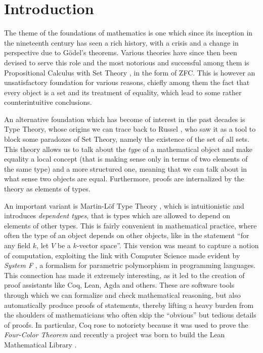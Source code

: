 \chapter*{Introduction}

The theme of the foundations of mathematics is one which since its inception in
the nineteenth century has seen a rich history, with a crisis and a change in
perspective due to G{\"o}del's theorems. Various theories have since then been
devised to serve this role and the most notorious and successful among them is
Propositional Calculus with
Set Theory \cite{Jec13}, in the form of ZFC. This is however an
unsatisfactory foundation
for various reasons, chiefly among them the fact that every object is a set and
its treatment of equality, which lead to some rather counterintuitive
conclusions.

\noindent
An alternative foundation which has become of interest in the past decades is
Type Theory, whose origins we can trace back to Russel \cite{Rus08,RW97},
who saw it as a tool to
block some paradoxes of Set Theory,
namely the existence of the set of all sets. This theory allows us to talk about
the \emph{type} of a mathematical
object and make equality a local concept (that is making sense only in terms of
two elements of the same type) and a more structured one, meaning that we can
talk about in what sense two objects are equal. Furthermore, proofs are
internalized by the theory as elements of types.

\noindent
An important variant is Martin-L{\"o}f Type Theory \cite{ML84}, which is
intuitionistic and introduces \emph{dependent types}, that is types which are
allowed to depend on elements of other types. This is fairly convenient in
mathematical practice, where often the type of an object depends on other
objects, like in the statement ``for any field
$k$, let $V$ be a $k$-vector space''. This version was meant
to capture a notion of computation, exploiting the link with Computer Science
made evident by \emph{System F} \cite{Gir89}, a formalism for parametric
polymorphism in programming languages. This connection
has made it extremely interesting, as it led to the
creation of proof assistants like Coq, Lean, Agda and others. These are software
tools through which we can formalize and check mathematical reasoning, but also
automatically produce proofs of statements, thereby lifting a heavy burden from
the shoulders of mathematicians who often skip the ``obvious'' but tedious
details of proofs. In particular, Coq rose to notoriety because it was used to
prove the \emph{Four-Color Theorem} \cite{Gon08} and recently a project
was born to build the Lean Mathematical Library \cite{mat20}.

